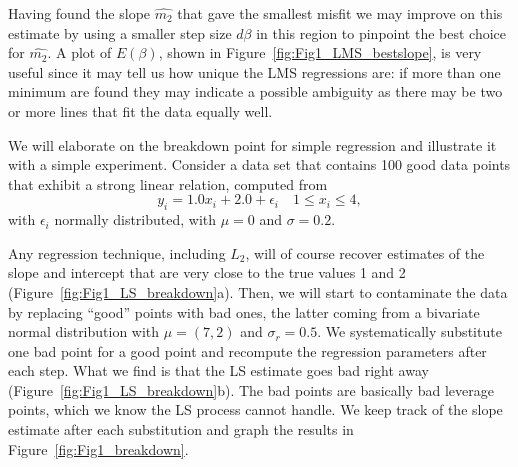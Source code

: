 
Having found the slope $\hat{m_2}$ that gave the smallest misfit we may improve on this estimate by using a smaller step size $d\beta$ in this region 
to pinpoint the best choice for $\hat{m_2}$.  A plot of $E(\beta)$, shown in Figure~\ref{fig:Fig1_LMS_bestslope},
is very useful since it may tell us how 
unique the LMS regressions are: if more than one minimum are found they may indicate a possible 
ambiguity as there may be two or more lines that fit the data equally well.

	We will elaborate on the breakdown point for simple regression and illustrate it with 
a simple experiment.  Consider a data set that contains 100 good data points that exhibit a 
strong linear relation, computed from
\begin{equation}
y_i = 1.0 x_i + 2.0 + \epsilon_i \quad 1 \leq x_i \leq 4,
\end{equation}
with $\epsilon_i$ normally distributed, with $\mu = 0$ and $\sigma =0.2$.


	Any regression technique, including $L_2$, will of course recover estimates of the slope and 
intercept that are very close to the true values 1 and 2 (Figure~\ref{fig:Fig1_LS_breakdown}a).  Then, we will start to contaminate the data 
by replacing ``good'' points with bad ones, the latter coming from a bivariate normal distribution 
with $\mu = (7, 2)$ and $\sigma_r = 0.5$.  We systematically substitute one bad point for a good point and 
recompute the regression parameters after each step.  What we find is that the LS estimate goes 
bad right away (Figure~\ref{fig:Fig1_LS_breakdown}b).  The bad points are basically bad leverage points, which we know the LS process 
cannot handle.  We keep track of the slope estimate after each substitution and graph the results
in Figure~\ref{fig:Fig1_breakdown}.

